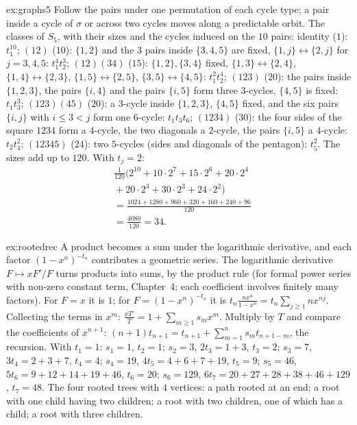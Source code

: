 \begin{solution}{ex:graphs5}
\idea Follow the pairs under one permutation of each cycle type; a pair inside a cycle of $\sigma$ or across two cycles moves along a
predictable orbit.
\writeup The classes of $S_5$, with their sizes and the cycles induced on the $10$ pairs:
identity ($1$): $t_1^{10}$; $(12)$ ($10$): $\{1,2\}$ and the $3$ pairs inside $\{3,4,5\}$ are fixed, $\{1,j\}\leftrightarrow\{2,j\}$ for $j=3,4,5$: $t_1^4t_2^3$;
$(12)(34)$ ($15$): $\{1,2\},\{3,4\}$ fixed, $\{1,3\}\leftrightarrow\{2,4\}$, $\{1,4\}\leftrightarrow\{2,3\}$, $\{1,5\}\leftrightarrow\{2,5\}$, $\{3,5\}\leftrightarrow\{4,5\}$: $t_1^2t_2^4$;
$(123)$ ($20$): the pairs inside $\{1,2,3\}$, the pairs $\{i,4\}$ and the pairs $\{i,5\}$ form three $3$-cycles, $\{4,5\}$ is fixed: $t_1t_3^3$;
$(123)(45)$ ($20$): a $3$-cycle inside $\{1,2,3\}$, $\{4,5\}$ fixed, and the six pairs $\{i,j\}$ with $i\le3<j$ form one $6$-cycle: $t_1t_3t_6$;
$(1234)$ ($30$): the four sides of the square $1234$ form a $4$-cycle, the two diagonals a $2$-cycle, the pairs $\{i,5\}$ a $4$-cycle: $t_2t_4^2$;
$(12345)$ ($24$): two $5$-cycles (sides and diagonals of the pentagon): $t_5^2$. The sizes add up to $120$. With $t_j=2$:
\[
\begin{aligned}{}&\tfrac1{120}\big(2^{10}+10\cdot2^7+15\cdot2^6+20\cdot2^4\\&{}+20\cdot2^3+30\cdot2^3+24\cdot2^2\big)\\&=\tfrac{1024+1280+960+320+160+240+96}{120}\\&=\tfrac{4080}{120}=34.\end{aligned}
\]
\end{solution}

\begin{solution}{ex:rootedrec}
\idea A product becomes a sum under the logarithmic derivative, and each factor $(1-x^n)^{-t_n}$ contributes a geometric series.
\writeup The logarithmic derivative $F\mapsto xF'/F$ turns products into sums, by the product rule (for formal power series with
non-zero constant term, Chapter~4; each coefficient involves finitely many factors). For $F=x$ it is $1$; for $F=(1-x^n)^{-t_n}$ it is
$t_n\frac{nx^n}{1-x^n}=t_n\sum_{j\ge1}nx^{nj}$. Collecting the terms in $x^m$: $\frac{xT'}T=1+\sum_{m\ge1}s_mx^m$. Multiply by $T$ and compare the coefficients of $x^{n+1}$:
$(n+1)t_{n+1}=t_{n+1}+\sum_{m=1}^ns_mt_{n+1-m}$, the recursion. With $t_1=1$: $s_1=1$, $t_2=1$; $s_2=3$, $2t_3=1+3$, $t_3=2$; $s_3=7$, $3t_4=2+3+7$, $t_4=4$;
$s_4=19$, $4t_5=4+6+7+19$, $t_5=9$; $s_5=46$, $5t_6=9+12+14+19+46$, $t_6=20$; $s_6=129$, $6t_7=20+27+28+38+46+129$, $t_7=48$. The four rooted trees
with $4$ vertices: a path rooted at an end; a root with one child having two children; a root with two children, one of which has
a child; a root with three children.
\end{solution}

